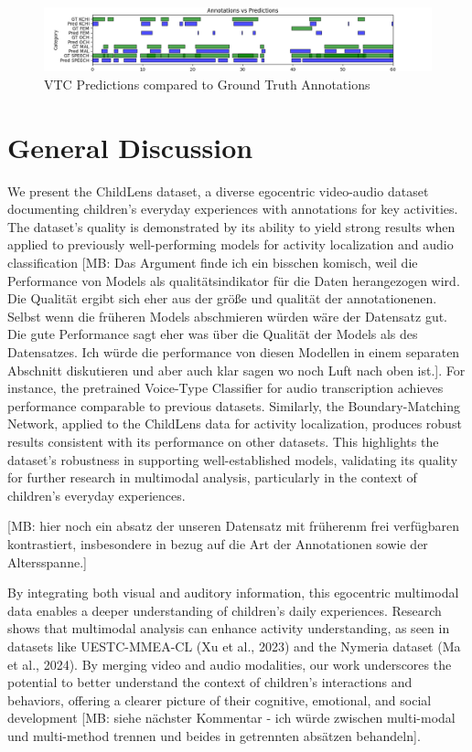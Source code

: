 \documentclass[
  man,floatsintext]{apa6}
\begin{document}
\begin{figure}

{\centering \includegraphics[width=6.67in]{images/vtc_performance_evaluation} 

}

\caption{VTC Predictions compared to Ground Truth Annotations}\label{fig:vtc-evaluations}
\end{figure}

\section{General Discussion}\label{general-discussion}

We present the ChildLens dataset, a diverse egocentric video-audio dataset documenting children's everyday experiences with annotations for key activities. The dataset's quality is demonstrated by its ability to yield strong results when applied to previously well-performing models for activity localization and audio classification {[}MB: Das Argument finde ich ein bisschen komisch, weil die Performance von Models als qualitätsindikator für die Daten herangezogen wird. Die Qualität ergibt sich eher aus der größe und qualität der annotationenen. Selbst wenn die früheren Models abschmieren würden wäre der Datensatz gut. Die gute Performance sagt eher was über die Qualität der Models als des Datensatzes. Ich würde die performance von diesen Modellen in einem separaten Abschnitt diskutieren und aber auch klar sagen wo noch Luft nach oben ist.{]}. For instance, the pretrained Voice-Type Classifier for audio transcription achieves performance comparable to previous datasets. Similarly, the Boundary-Matching Network, applied to the ChildLens data for activity localization, produces robust results consistent with its performance on other datasets. This highlights the dataset's robustness in supporting well-established models, validating its quality for further research in multimodal analysis, particularly in the context of children's everyday experiences.

{[}MB: hier noch ein absatz der unseren Datensatz mit früherenm frei verfügbaren kontrastiert, insbesondere in bezug auf die Art der Annotationen sowie der Altersspanne.{]}

By integrating both visual and auditory information, this egocentric multimodal data enables a deeper understanding of children's daily experiences. Research shows that multimodal analysis can enhance activity understanding, as seen in datasets like UESTC-MMEA-CL (Xu et al., 2023) and the Nymeria dataset (Ma et al., 2024). By merging video and audio modalities, our work underscores the potential to better understand the context of children's interactions and behaviors, offering a clearer picture of their cognitive, emotional, and social development {[}MB: siehe nächster Kommentar - ich würde zwischen multi-modal und multi-method trennen und beides in getrennten absätzen behandeln{]}.
\end{document}
